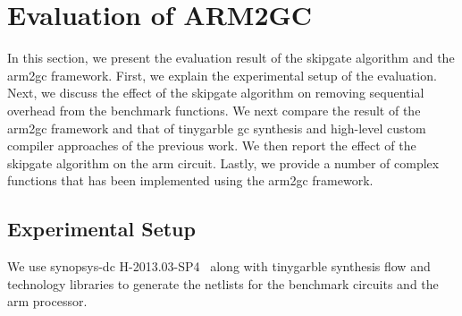 
\section{Evaluation of ARM2GC}\label{sec:eval-arm2gc}
In this section, we present the evaluation result of the \gls{skipgate} algorithm and the \gls{arm2gc} framework.
First, we explain the experimental setup of the evaluation.
Next, we discuss the effect of the \gls{skipgate} algorithm on removing sequential overhead from the benchmark functions.
We next compare the result of the \gls{arm2gc} framework and that of \gls{tinygarble} \acrshort{gc} synthesis and high-level custom compiler approaches of the previous work.
We then report the effect of the \gls{skipgate} algorithm on the \gls{arm} circuit.
Lastly, we provide a number of complex functions that has been implemented using the \gls{arm2gc} framework.

\subsection{Experimental Setup}
We use \gls{synopsys-dc} H-2013.03-SP4~\cite{tool:DesignCompiler} along with \gls{tinygarble} synthesis flow and technology libraries to generate the \gls{netlist}s for the benchmark circuits and the \gls{arm} processor.


